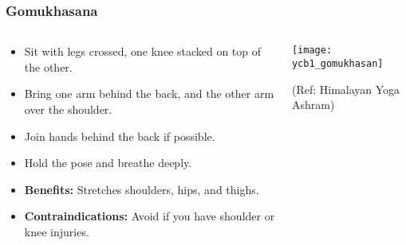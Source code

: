 \begin{frame}[fragile]\frametitle{Gomukhasana}
\begin{columns}
    \begin{column}[T]{0.5\linewidth}
      \begin{itemize}
        \item Sit with legs crossed, one knee stacked on top of the other.
        \item Bring one arm behind the back, and the other arm over the shoulder.
        \item Join hands behind the back if possible.
        \item Hold the pose and breathe deeply.
        \item \textbf{Benefits:} Stretches shoulders, hips, and thighs.
        \item \textbf{Contraindications:} Avoid if you have shoulder or knee injuries.
      \end{itemize}
    \end{column}
    \begin{column}[T]{0.5\linewidth}
        \begin{center}
        \begin{center}
		        \texttt{[image: ycb1\_gomukhasan]}
				
				{\tiny (Ref: Himalayan Yoga Ashram)}	        
		\end{center}   
        \end{center}    
    \end{column}
  \end{columns}
\end{frame}

